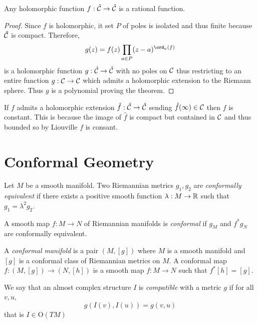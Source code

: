 \documentclass[12pt]{article}
\begin{document}
\begin{prop}
Any holomorphic function $f : \hat{\C} \to \hat{\C}$ is a rational function.
\end{prop}


\begin{proof}
Since $f$ is holomorphic, it set $P$ of poles is isolated and thus finite because $\hat{\C}$ is compact. Therefore,
\[ g(z) = f(z) \prod_{a \in P} (z - a)^{\ord_a(f)} \]
is a holomorphic function $g : \hat{\C} \to \hat{\C}$ with no poles on $\C$ thus restricting to an entire function $g : \C \to \C$ which admits a holomorphic extension to the Riemann sphere. Thus $g$ is a polynomial proving the theorem. 
\end{proof}

\begin{rmk}
If $f$ admits a holomorphic extension $\hat{f} : \hat{\C} \to \hat{\C}$ sending $\hat{f}(\infty) \in \C$ then $f$ is constant. This is because the image of $\hat{f}$ is compact but contained in $\C$ and thus bounded so by Liouville $f$ is consant.
\end{rmk}


\section{Conformal Geometry}

\renewcommand{\C}{\mathcal{C}}

\begin{defn}
Let $M$ be a smooth manifold. Two Riemannian metrics $g_1, g_2$ are \textit{conformally equivalent} if there exists a positive smooth function $\lambda : M \to \mathbb{R}$ such that $g_1 = \lambda^2 g_2$.
\end{defn}

\begin{defn}
A smooth map $f : M \to N$ of Riemannian manifolds is \textit{conformal} if $g_M$ and $f^* g_N$ are conformally equivalent. 
\end{defn}

\begin{defn}
A \textit{conformal manifold} is a pair $(M, [g])$ where $M$ is a smooth manifold and $[g]$ is a conformal class of Riemannian metrics on $M$. A conformal map $f : (M, [g]) \to (N, [h])$ is a smooth map $f : M \to N$ such that $f^* [h] = [g]$.
\end{defn}

\begin{defn}
We say that an almost complex structure $I$ is \textit{compatible} with a metric $g$ if for all $v, u$,
\[ g(I(v), I(u)) = g(v, u) \]
that is $I \in \mathrm{O}(TM)$
\end{defn}
\end{document}

